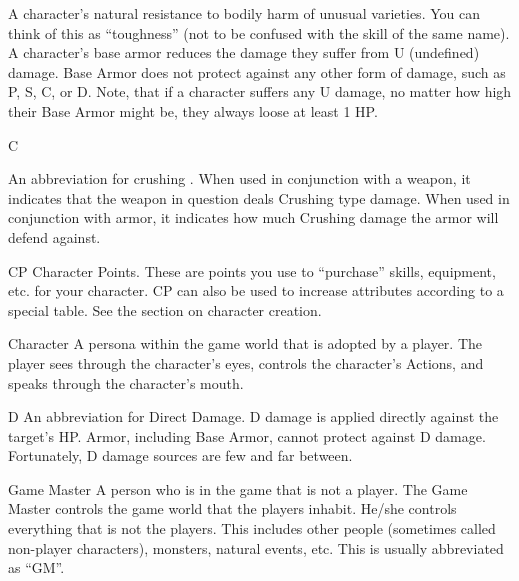 \documentclass[twoside]{book}
\begin{document}
                  A character’s natural resistance to bodily
                 harm of unusual varieties. You can think of this as
                 “toughness” (not to be confused with the
                 skill of the same name). A character’s base armor
                 reduces the damage they suffer from U (undefined)
                 damage. Base Armor does not protect against any other
                 form of damage, such as P, S, C, or D. Note, that if a
                 character suffers any U damage, no matter how high their
                 Base Armor might be, they always loose at least 1 HP.
                 
              
              
              
                 C 
                
                An abbreviation for 
                  crushing  . When used in conjunction
                  with a weapon, it indicates that the weapon in question
                  deals Crushing type damage. When used in conjunction
                  with armor, it indicates how much Crushing damage the
                  armor will defend against.
                
              
              
               CP   
                  Character Points. These are points you use to
                 “purchase” skills, equipment, etc. for your
                 character. CP can also be used to increase attributes
                 according to a special table. See the section on
                 character creation. 
              
              
               Character   
                  A persona within the game world that is adopted
                 by a player. The player sees through the
                 character’s eyes, controls the character’s
                 Actions, and speaks through the character’s mouth.
                 
              
              
               D   
                  An abbreviation for Direct Damage. D damage is
                 applied directly against the target’s HP. Armor,
                 including Base Armor, cannot protect against D damage.
                 Fortunately, D damage sources are few and far between.
                 
              
              
               Game Master   
                  A person who is in the game that is not a player.
                 The Game Master controls the game world that the players
                 inhabit. He/she controls everything that is not the
                 players. This includes other people (sometimes called
                 non-player characters), monsters, natural events, etc.
                 This is usually abbreviated as “GM”. 
              
\end{document}
